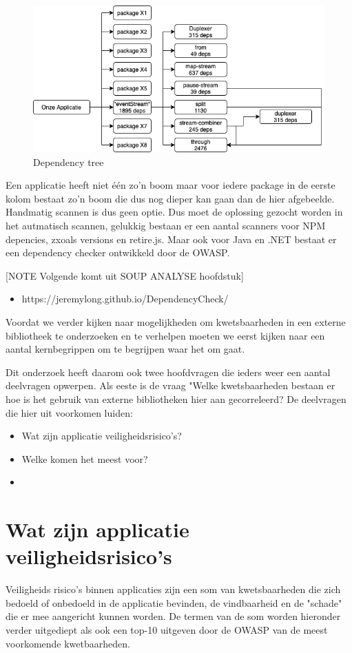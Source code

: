 \begin{figure}[H]
    \myfloatalign
    \includegraphics[width=12cm]{gfx/dependency-tree}
    \caption{Dependency tree}\label{fig:dependency-tree}
\end{figure}
Een applicatie heeft niet één zo'n boom maar voor iedere package in de eerste kolom bestaat zo'n boom die dus nog dieper kan gaan dan de hier afgebeelde.
Handmatig scannen is dus geen optie.
Dus moet de oplossing gezocht worden in het autmatisch scannen, gelukkig bestaan er een aantal scanners voor NPM depencies, zxoals versions en retire.js.
Maar ook voor Java en .NET bestaat er een dependency checker ontwikkeld door de OWASP\@.


[NOTE Volgende komt uit SOUP ANALYSE hoofdstuk]

\begin{itemize}
    \item https://jeremylong.github.io/DependencyCheck/
\end{itemize}

Voordat we verder kijken naar mogelijkheden om kwetsbaarheden in een externe bibliotheek te onderzoeken en te verhelpen moeten we eerst kijken naar een aantal kernbegrippen om te begrijpen waar het om gaat.

Dit onderzoek heeft daarom ook twee hoofdvragen die ieders weer een aantal deelvragen opwerpen.
Als eeste is de vraag "Welke kwetsbaarheden bestaan er hoe is het gebruik van externe bibliotheken hier aan gecorreleerd?
De deelvragen die hier uit voorkomen luiden:
\begin{itemize}
    \item Wat zijn applicatie veiligheidsrisico's?
    \item Welke komen het meest voor?
    \item
\end{itemize}

\section{Wat zijn applicatie veiligheidsrisico's}\label{sec:wat-zijn-applicatie-veiligheids-risico's}
Veiligheids risico's binnen applicaties zijn een som van kwetsbaarheden die zich bedoeld of onbedoeld in de applicatie bevinden, de vindbaarheid en de "schade" die er mee aangericht kunnen worden.
De termen van de som worden hieronder verder uitgediept als ook een top-10 uitgeven door de OWASP van de meest voorkomende kwetbaarheden.


